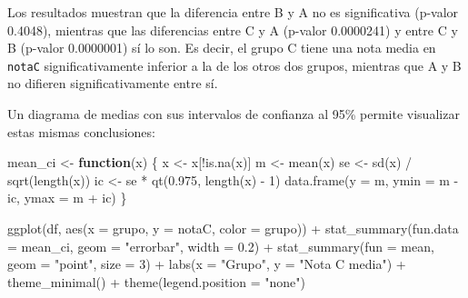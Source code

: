 \documentclass[
  spanish,
  a4paper,
]{scrreport}
\newenvironment{Shaded}{\begin{snugshade}}{\end{snugshade}}
\newcommand{\AttributeTok}[1]{\textcolor[rgb]{0.40,0.45,0.13}{#1}}
\newcommand{\ControlFlowTok}[1]{\textcolor[rgb]{0.00,0.23,0.31}{\textbf{#1}}}
\newcommand{\DecValTok}[1]{\textcolor[rgb]{0.68,0.00,0.00}{#1}}
\newcommand{\FloatTok}[1]{\textcolor[rgb]{0.68,0.00,0.00}{#1}}
\newcommand{\FunctionTok}[1]{\textcolor[rgb]{0.28,0.35,0.67}{#1}}
\newcommand{\NormalTok}[1]{\textcolor[rgb]{0.00,0.23,0.31}{#1}}
\newcommand{\OtherTok}[1]{\textcolor[rgb]{0.00,0.23,0.31}{#1}}
\newcommand{\SpecialCharTok}[1]{\textcolor[rgb]{0.37,0.37,0.37}{#1}}
\newcommand{\StringTok}[1]{\textcolor[rgb]{0.13,0.47,0.30}{#1}}
\newcounter{none} %
\theoremstyle{definition}
\theoremstyle{definition}
\theoremstyle{remark}
\begin{document}
Los resultados muestran que la diferencia entre B y A no es
significativa (p-valor 0.4048), mientras que las diferencias entre C y A
(p-valor 0.0000241) y entre C y B (p-valor 0.0000001) sí lo son. Es
decir, el grupo C tiene una nota media en \texttt{notaC}
significativamente inferior a la de los otros dos grupos, mientras que A
y B no difieren significativamente entre sí.

Un diagrama de medias con sus intervalos de confianza al 95\% permite
visualizar estas mismas conclusiones:

\begin{Shaded}
\begin{Highlighting}[]
\NormalTok{mean\_ci }\OtherTok{\textless{}{-}} \ControlFlowTok{function}\NormalTok{(x) \{}
\NormalTok{  x }\OtherTok{\textless{}{-}}\NormalTok{ x[}\SpecialCharTok{!}\FunctionTok{is.na}\NormalTok{(x)]}
\NormalTok{  m }\OtherTok{\textless{}{-}} \FunctionTok{mean}\NormalTok{(x)}
\NormalTok{  se }\OtherTok{\textless{}{-}} \FunctionTok{sd}\NormalTok{(x) }\SpecialCharTok{/} \FunctionTok{sqrt}\NormalTok{(}\FunctionTok{length}\NormalTok{(x))}
\NormalTok{  ic }\OtherTok{\textless{}{-}}\NormalTok{ se }\SpecialCharTok{*} \FunctionTok{qt}\NormalTok{(}\FloatTok{0.975}\NormalTok{, }\FunctionTok{length}\NormalTok{(x) }\SpecialCharTok{{-}} \DecValTok{1}\NormalTok{)}
  \FunctionTok{data.frame}\NormalTok{(}\AttributeTok{y =}\NormalTok{ m, }\AttributeTok{ymin =}\NormalTok{ m }\SpecialCharTok{{-}}\NormalTok{ ic, }\AttributeTok{ymax =}\NormalTok{ m }\SpecialCharTok{+}\NormalTok{ ic)}
\NormalTok{\}}

\FunctionTok{ggplot}\NormalTok{(df, }\FunctionTok{aes}\NormalTok{(}\AttributeTok{x =}\NormalTok{ grupo, }\AttributeTok{y =}\NormalTok{ notaC, }\AttributeTok{color =}\NormalTok{ grupo)) }\SpecialCharTok{+}
  \FunctionTok{stat\_summary}\NormalTok{(}\AttributeTok{fun.data =}\NormalTok{ mean\_ci, }\AttributeTok{geom =} \StringTok{"errorbar"}\NormalTok{, }\AttributeTok{width =} \FloatTok{0.2}\NormalTok{) }\SpecialCharTok{+}
  \FunctionTok{stat\_summary}\NormalTok{(}\AttributeTok{fun =}\NormalTok{ mean, }\AttributeTok{geom =} \StringTok{"point"}\NormalTok{, }\AttributeTok{size =} \DecValTok{3}\NormalTok{) }\SpecialCharTok{+}
  \FunctionTok{labs}\NormalTok{(}\AttributeTok{x =} \StringTok{"Grupo"}\NormalTok{, }\AttributeTok{y =} \StringTok{"Nota C media"}\NormalTok{) }\SpecialCharTok{+}
  \FunctionTok{theme\_minimal}\NormalTok{() }\SpecialCharTok{+}
  \FunctionTok{theme}\NormalTok{(}\AttributeTok{legend.position =} \StringTok{"none"}\NormalTok{)}
\end{Highlighting}
\end{Shaded}
\end{document}

